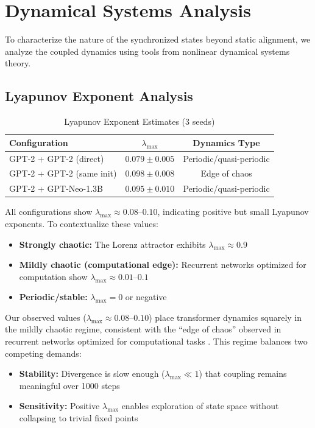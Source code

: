 \documentclass[10pt]{article} %
\theoremstyle{plain}
\theoremstyle{definition}
\theoremstyle{remark}
\begin{document}
\section{Dynamical Systems Analysis}

To characterize the nature of the synchronized states beyond static alignment, we analyze the coupled dynamics using tools from nonlinear dynamical systems theory.

\subsection{Lyapunov Exponent Analysis}

\begin{table}[htbp]
\centering
\caption{Lyapunov Exponent Estimates (3 seeds)}
\label{tab:lyapunov}
\small
\begin{tabular}{lcc}
\toprule
\textbf{Configuration} & \textbf{$\lambda_{\max}$} & \textbf{Dynamics Type} \\
\midrule
GPT-2 + GPT-2 (direct) & $0.079 \pm 0.005$ & Periodic/quasi-periodic \\
GPT-2 + GPT-2 (same init) & $0.098 \pm 0.008$ & Edge of chaos \\
GPT-2 + GPT-Neo-1.3B & $0.095 \pm 0.010$ & Periodic/quasi-periodic \\
\bottomrule
\end{tabular}
\end{table}

All configurations show $\lambda_{\max} \approx 0.08$--$0.10$, indicating positive but small Lyapunov exponents. To contextualize these values:
\begin{itemize}
    \item \textbf{Strongly chaotic:} The Lorenz attractor exhibits $\lambda_{\max} \approx 0.9$
    \item \textbf{Mildly chaotic (computational edge):} Recurrent networks optimized for computation show $\lambda_{\max} \approx 0.01$--$0.1$ \cite{bertschinger2004real}
    \item \textbf{Periodic/stable:} $\lambda_{\max} = 0$ or negative
\end{itemize}

Our observed values ($\lambda_{\max} \approx 0.08$--$0.10$) place transformer dynamics squarely in the mildly chaotic regime, consistent with the ``edge of chaos'' observed in recurrent networks optimized for computational tasks \cite{langton1990computation,bertschinger2004real}. This regime balances two competing demands:
\begin{itemize}
    \item \textbf{Stability:} Divergence is slow enough ($\lambda_{\max} \ll 1$) that coupling remains meaningful over 1000 steps
    \item \textbf{Sensitivity:} Positive $\lambda_{\max}$ enables exploration of state space without collapsing to trivial fixed points
\end{itemize}
\end{document}

